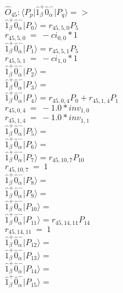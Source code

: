 \documentclass[14pt]{article}
\begin{document}
    $\hat{O}_{45}:  \langle{P_p}\vert \hat{1}_{\beta}^{+}\hat{0}_{\alpha}^{-} \vert{P_q}\rangle => $ \\ 
    $ \hat{1}_{\beta}^{+}\hat{0}_{\alpha}^{-} \vert{P_{0}}\rangle = {r}_{45,5,0}P_{5} $ \\ 
    ${r}_{45,5,0}\ =\ -{ci}_{0,0}*1 $ \\ 
    $ \hat{1}_{\beta}^{+}\hat{0}_{\alpha}^{-} \vert{P_{1}}\rangle = {r}_{45,5,1}P_{5} $ \\ 
    ${r}_{45,5,1}\ =\ -{ci}_{1,0}*1 $ \\ 
    $ \hat{1}_{\beta}^{+}\hat{0}_{\alpha}^{-} \vert{P_{2}}\rangle =  $ \\ 
    $ \hat{1}_{\beta}^{+}\hat{0}_{\alpha}^{-} \vert{P_{3}}\rangle =  $ \\ 
    $ \hat{1}_{\beta}^{+}\hat{0}_{\alpha}^{-} \vert{P_{4}}\rangle = {r}_{45,0,4}P_{0}+{r}_{45,1,4}P_{1} $ \\ 
    ${r}_{45,0,4}\ =\ -1.0*{inv}_{1,0} $ \\ 
    ${r}_{45,1,4}\ =\ -1.0*{inv}_{1,1} $ \\ 
    $ \hat{1}_{\beta}^{+}\hat{0}_{\alpha}^{-} \vert{P_{5}}\rangle =  $ \\ 
    $ \hat{1}_{\beta}^{+}\hat{0}_{\alpha}^{-} \vert{P_{6}}\rangle =  $ \\ 
    $ \hat{1}_{\beta}^{+}\hat{0}_{\alpha}^{-} \vert{P_{7}}\rangle = {r}_{45,10,7}P_{10} $ \\ 
    ${r}_{45,10,7}\ =\ 1 $ \\ 
    $ \hat{1}_{\beta}^{+}\hat{0}_{\alpha}^{-} \vert{P_{8}}\rangle =  $ \\ 
    $ \hat{1}_{\beta}^{+}\hat{0}_{\alpha}^{-} \vert{P_{9}}\rangle =  $ \\ 
    $ \hat{1}_{\beta}^{+}\hat{0}_{\alpha}^{-} \vert{P_{10}}\rangle =  $ \\ 
    $ \hat{1}_{\beta}^{+}\hat{0}_{\alpha}^{-} \vert{P_{11}}\rangle = {r}_{45,14,11}P_{14} $ \\ 
    ${r}_{45,14,11}\ =\ 1 $ \\ 
    $ \hat{1}_{\beta}^{+}\hat{0}_{\alpha}^{-} \vert{P_{12}}\rangle =  $ \\ 
    $ \hat{1}_{\beta}^{+}\hat{0}_{\alpha}^{-} \vert{P_{13}}\rangle =  $ \\ 
    $ \hat{1}_{\beta}^{+}\hat{0}_{\alpha}^{-} \vert{P_{14}}\rangle =  $ \\ 
    $ \hat{1}_{\beta}^{+}\hat{0}_{\alpha}^{-} \vert{P_{15}}\rangle =  $ \\ 
    
\end{document}
